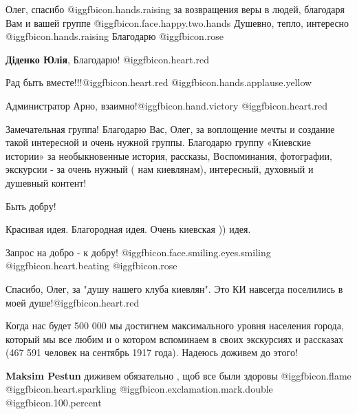 \begin{itemize}

Олег, спасибо  @igg{fbicon.hands.raising}  за возвращения веры в людей,
благодаря Вам и вашей группе  @igg{fbicon.face.happy.two.hands} Душевно, тепло,
интересно  @igg{fbicon.hands.raising}  Благодарю  @igg{fbicon.rose} 

\begin{itemize} %
\textbf{Діденко Юлія}, Благодарю! @igg{fbicon.heart.red}
\end{itemize} %

Рад быть вместе!!!@igg{fbicon.heart.red} @igg{fbicon.hands.applause.yellow} 

\begin{itemize} %
Администратор
Арно, взаимно!@igg{fbicon.hand.victory} @igg{fbicon.heart.red}
\end{itemize} %


Замечательная группа! Благодарю Вас, Олег, за воплощение мечты и создание такой
интересной и очень нужной группы. Благодарю группу «Киевские истории» за
необыкновенные история, рассказы, Воспоминания, фотографии, экскурсии - за
очень нужный ( нам киевлянам), интересный, духовный и душевный контент!

Быть добру!


Красивая идея. Благородная идея. Очень киевская )) идея.

Запрос на добро - к добру!  @igg{fbicon.face.smiling.eyes.smiling}  @igg{fbicon.heart.beating}  @igg{fbicon.rose} 

Спасибо, Олег, за "душу нашего клуба киевлян". Это КИ навсегда поселились в моей душе!@igg{fbicon.heart.red}


Когда нас будет 500 000 мы достигнем максимального уровня населения города,
который мы все любим и о котором вспоминаем в своих экскурсиях и рассказах (467
591 человек на сентябрь 1917 года). Надеюсь доживем до этого!

\begin{itemize} %
\textbf{Maksim Pestun} диживем обязательно , щоб все были здоровы  @igg{fbicon.flame}  @igg{fbicon.heart.sparkling} @igg{fbicon.exclamation.mark.double}  @igg{fbicon.100.percent} 
\end{itemize} %


\end{itemize}
